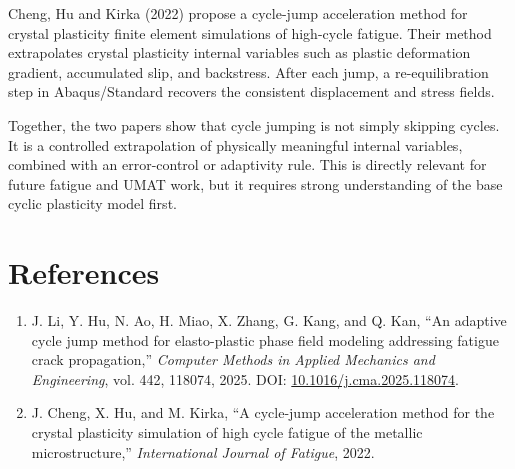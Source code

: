 \documentclass[11pt,a4paper]{article}
\begin{document}
Cheng, Hu and Kirka (2022) propose a cycle-jump acceleration method for crystal plasticity finite element simulations of high-cycle fatigue. Their method extrapolates crystal plasticity internal variables such as plastic deformation gradient, accumulated slip, and backstress. After each jump, a re-equilibration step in Abaqus/Standard recovers the consistent displacement and stress fields.

Together, the two papers show that cycle jumping is not simply skipping cycles. It is a controlled extrapolation of physically meaningful internal variables, combined with an error-control or adaptivity rule. This is directly relevant for future fatigue and UMAT work, but it requires strong understanding of the base cyclic plasticity model first.

\section*{References}

\begin{enumerate}
    \item J. Li, Y. Hu, N. Ao, H. Miao, X. Zhang, G. Kang, and Q. Kan, ``An adaptive cycle jump method for elasto-plastic phase field modeling addressing fatigue crack propagation,'' \textit{Computer Methods in Applied Mechanics and Engineering}, vol. 442, 118074, 2025. DOI: \href{https://doi.org/10.1016/j.cma.2025.118074}{10.1016/j.cma.2025.118074}.
    \item J. Cheng, X. Hu, and M. Kirka, ``A cycle-jump acceleration method for the crystal plasticity simulation of high cycle fatigue of the metallic microstructure,'' \textit{International Journal of Fatigue}, 2022.
\end{enumerate}
\end{document}
